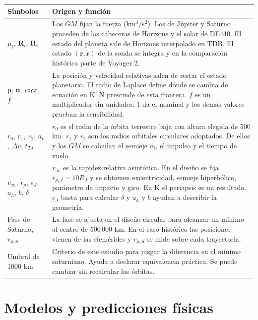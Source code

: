 \documentclass[11pt,letterpaper]{article}
\newcommand{\vect}[1]{\mathbf{#1}}
\begin{document}
\begin{center}\footnotesize
\begin{tabular}{@{}p{.20\linewidth}p{.74\linewidth}@{}}
\toprule
Símbolos & Origen y función\\
\midrule
$\mu_i$, $\vect R_i$, $\dot{\vect R}_i$ &
Los $GM$ fijan la fuerza (km$^3$/s$^2$). Los de Júpiter y Saturno proceden de las cabeceras de Horizons y el solar de DE440. El estado del planeta sale de Horizons interpolado en TDB. El estado $(\vect r,\dot{\vect r})$ de la sonda se integra y en la comparación histórica parte de Voyager 2.\\
$\vect\rho$, $\vect u$, $r_{\rm SOI}$, $f$ &
La posición y velocidad relativas salen de restar el estado planetario. El radio de Laplace define dónde se cambia de ecuación en K. N prescinde de esta frontera. $f$ es un multiplicador sin unidades: $1$ da el nominal y los demás valores prueban la sensibilidad.\\
$r_0$, $r_1$, $r_2$, $a_t$, $\Delta v$, $t_{TJ}$ &
$r_0$ es el radio de la órbita terrestre baja con altura elegida de 500 km. $r_1$ y $r_2$ son los radios orbitales circulares adoptados. De ellos y los $GM$ se calculan el semieje $a_t$, el impulso y el tiempo de vuelo.\\
$v_\infty$, $r_p$, $e_J$, $a_h$, $b$, $\delta$ &
$v_\infty$ es la rapidez relativa asintótica. En el diseño se fija $r_{p,J}=10R_J$ y se obtienen excentricidad, semieje hiperbólico, parámetro de impacto y giro. En K el periapsis es un resultado. $e_J$ basta para calcular $\delta$ y $a_h$ y $b$ ayudan a describir la geometría.\\
Fase de Saturno, $r_{p,S}$ &
La fase se ajusta en el diseño circular para alcanzar un mínimo al centro de 500\,000 km. En el caso histórico las posiciones vienen de las efemérides y $r_{p,S}$ se mide sobre cada trayectoria.\\
Umbral de 1000 km &
Criterio de este estudio para juzgar la diferencia en el mínimo saturniano. Ayuda a declarar equivalencia práctica. Se puede cambiar sin recalcular las órbitas.\\
\bottomrule
\end{tabular}
\end{center}

\section{Modelos y predicciones físicas}
\end{document}
